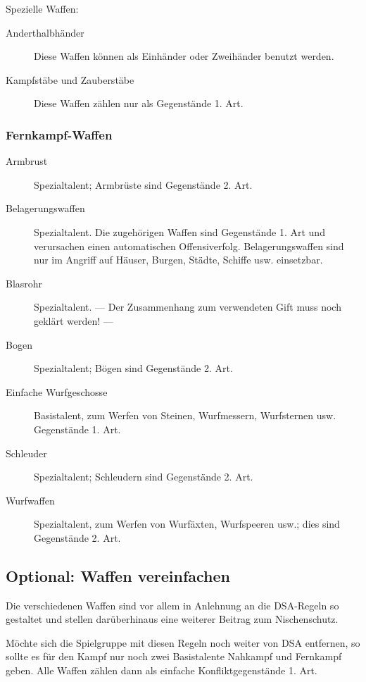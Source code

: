 Spezielle Waffen:
\begin{description}
\item[Anderthalbhänder] Diese Waffen können als Einhänder oder Zweihänder benutzt werden.
\item[Kampfstäbe und Zauberstäbe] Diese Waffen zählen nur als Gegenstände 1. Art.
\end{description}

\subsubsection{Fernkampf-Waffen}
\begin{description}
\item[Armbrust] Spezialtalent; Armbrüste sind Gegenstände 2. Art.
\item[Belagerungswaffen] Spezialtalent. Die zugehörigen Waffen sind Gegenstände 1. Art und verursachen einen automatischen Offensiverfolg. Belagerungswaffen sind nur im Angriff auf Häuser, Burgen, Städte, Schiffe usw. einsetzbar.
\item[Blasrohr] Spezialtalent. --- Der Zusammenhang zum verwendeten Gift muss noch geklärt werden! ---
\item[Bogen] Spezialtalent; Bögen sind Gegenstände 2. Art.
\item[Einfache Wurfgeschosse] Basistalent, zum Werfen von Steinen, Wurfmessern, Wurfsternen usw. Gegenstände 1. Art.
\item[Schleuder] Spezialtalent; Schleudern sind Gegenstände 2. Art.
\item[Wurfwaffen] Spezialtalent, zum Werfen von Wurfäxten, Wurfspeeren usw.; dies sind Gegenstände 2. Art.
\end{description}


\begin{optional}
\subsection{Optional: Waffen vereinfachen}
Die verschiedenen Waffen sind vor allem in Anlehnung an die DSA-Regeln so gestaltet und stellen darüberhinaus eine weiterer Beitrag zum Nischenschutz.

Möchte sich die Spielgruppe mit diesen Regeln noch weiter von DSA entfernen, so sollte es für den Kampf nur noch zwei Basistalente Nahkampf und Fernkampf geben. Alle Waffen zählen dann als einfache Konfliktgegenstände 1. Art.
\end{optional}

